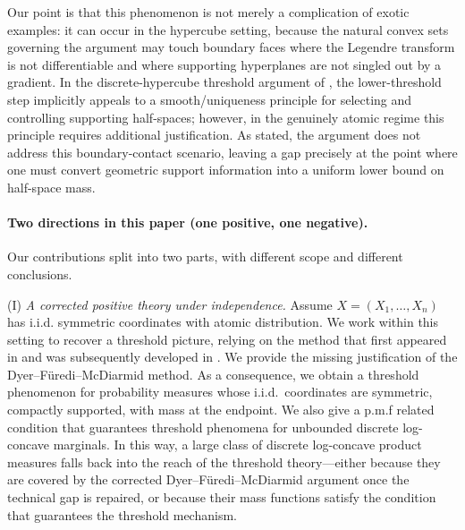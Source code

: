 \documentclass[11pt,a4paper]{article} %
\theoremstyle{definition}
\theoremstyle{remark}
\newcommand{\1}{\mathds{1}}
\begin{document}
Our point is that this phenomenon is not merely a complication of exotic examples: it can occur in the hypercube setting, because the natural
convex sets governing the argument may touch boundary faces where the Legendre transform is not differentiable and where supporting hyperplanes
are not singled out by a gradient. In the discrete-hypercube threshold argument of \cite{DFM}, the lower-threshold step implicitly appeals to a
smooth/uniqueness principle for selecting and controlling supporting half-spaces; however, in the genuinely atomic regime this principle requires
additional justification. As stated, the argument does not address this boundary-contact scenario, leaving a gap precisely at the point where one
must convert geometric support information into a uniform lower bound on half-space mass.


\paragraph{Two directions in this paper (one positive, one negative).}
Our contributions split into two parts, with different scope and different conclusions.

\smallskip

(I) \emph{A corrected positive theory under independence.}
Assume $X=(X_1,\dots,X_n)$ has i.i.d. symmetric coordinates with atomic distribution.
We work within this setting to recover a threshold picture, relying on the method that first appeared in \cite{DFM} and was subsequently developed in \cite{GaGia,Paf}. We provide the missing justification of the Dyer--F\"uredi--McDiarmid method.
As a consequence, we obtain a threshold phenomenon for probability measures whose i.i.d.\ coordinates are symmetric, compactly supported, with mass at the endpoint.
We also give a p.m.f related condition that guarantees threshold phenomena for unbounded discrete log-concave marginals.  
In this way, a large class of discrete log-concave product measures falls back into the reach of the threshold theory—either because they are covered by the corrected Dyer–F\"uredi–McDiarmid argument once the technical gap is repaired, or because their mass functions satisfy the condition that guarantees the threshold mechanism.


\smallskip
\end{document}
